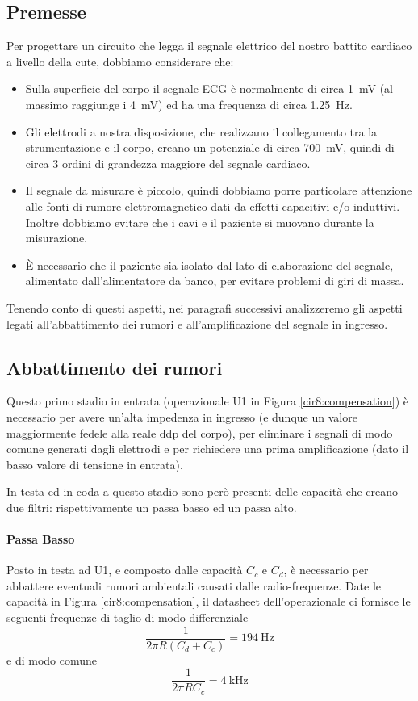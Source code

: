 \subsection{Premesse}

Per progettare un circuito che legga il segnale elettrico del nostro battito cardiaco a livello della cute, dobbiamo considerare che:
\begin{itemize} [noitemsep]
	\item Sulla superficie del corpo il segnale ECG è normalmente di circa \SI{1}{mV} (al massimo raggiunge i \SI{4}{mV}) ed ha una frequenza di circa \SI{1.25}{\Hz}.
	\item Gli elettrodi a nostra disposizione, che realizzano il collegamento tra la strumentazione e il corpo, creano un potenziale di circa \SI{700}{\mV}, quindi di circa \num{3} ordini di grandezza maggiore del segnale cardiaco.
	\item Il segnale da misurare è piccolo, quindi dobbiamo porre particolare attenzione alle fonti di rumore elettromagnetico dati da effetti capacitivi e/o induttivi. Inoltre dobbiamo evitare che i cavi e il paziente si muovano durante la misurazione.
	\item È necessario che il paziente sia isolato dal lato di elaborazione del segnale, alimentato dall'alimentatore da banco, per evitare problemi di giri di massa.
\end{itemize}

Tenendo conto di questi aspetti, nei paragrafi successivi analizzeremo gli aspetti legati all'abbattimento dei rumori e all'amplificazione del segnale in ingresso.

\subsection{Abbattimento dei rumori}

Questo primo stadio in entrata (operazionale U1 in Figura \ref{cir8:compensation}) è necessario per avere un'alta impedenza in ingresso (e dunque un valore maggiormente fedele alla reale ddp del corpo), per eliminare i segnali di modo comune generati dagli elettrodi e per richiedere una prima amplificazione (dato il basso valore di tensione in entrata).

In testa ed in coda a questo stadio sono però presenti delle capacità che creano due filtri: rispettivamente un passa basso ed un passa alto.

\paragraph{Passa Basso} Posto in testa ad U1, e composto dalle capacità $C_c$ e $C_d$, è necessario per abbattere eventuali rumori ambientali causati dalle radio-frequenze. Date le capacità in Figura \ref{cir8:compensation}, il datasheet dell'operazionale ci fornisce le seguenti frequenze di taglio di modo differenziale
\begin{equation*}
	\frac{1}{2 \pi R ( C_d + C_c ) } = \SI{194}{\Hz}
\end{equation*}
e di modo comune
\begin{equation*}
	\frac{1}{2 \pi R C_c} = \SI{4}{\kHz}
\end{equation*}


